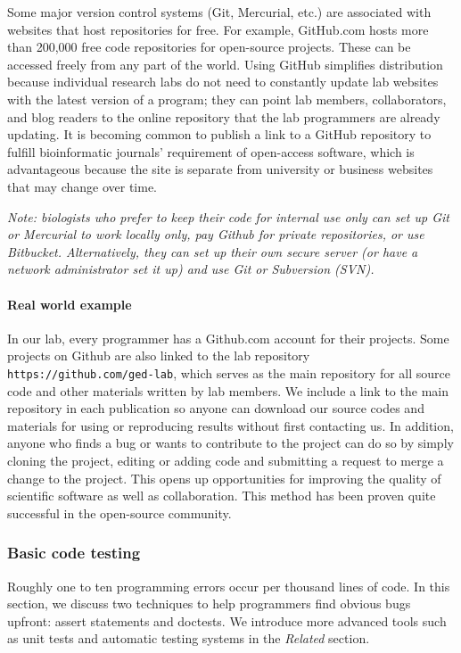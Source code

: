 \documentclass[ChapterTOCs,krantz2]{krantz} %
\begin{document}
Some major version control systems (Git, Mercurial, etc.) are associated with websites 
that host repositories for free.  For example, GitHub.com hosts more than 200,000 free code
repositories for open-source projects. These can be accessed
freely from any part of the world.  Using GitHub
simplifies distribution because individual research labs do not need to
constantly update lab websites with the latest version of a program;
they can point lab members, collaborators, and blog readers to the online
repository that the lab programmers are already updating.  It is becoming 
common to publish a link to a GitHub repository to
fulfill bioinformatic journals' requirement of open-access software, 
which is advantageous because the site is separate from
university or business websites that may change over time.  

\textsl{Note: biologists who prefer to keep their
code for internal use only can set up Git or Mercurial to work 
locally only, pay Github for private repositories, or use Bitbucket.  
Alternatively, they can set up their own secure
server (or have a network administrator set it up) and use
Git or Subversion (SVN).}

\paragraph{Real world example}

In our lab, every programmer has a Github.com account for their projects.
Some
projects on Github are also linked to the lab repository
\texttt{https://github.com/ged-lab}, which serves as the main repository for
all source code and other materials written by lab members. 
We include a link to the main repository in each
publication so anyone can download our source codes and materials
for using or reproducing results without first contacting us. 
In addition, anyone who finds a bug or wants to contribute to
the project can do so by simply cloning the project, editing or adding code
and submitting a request to merge a change to the project.
This opens up opportunities for improving the quality of scientific software
as well as collaboration.
This method has been proven quite successful in the open-source community.

\subsubsection{Basic code testing}

Roughly one to ten programming errors occur 
per thousand lines of code\cite{Boehm2005,Ince2012}.  
In this section, we discuss two techniques to help
programmers find obvious bugs upfront: 
assert statements and doctests. We introduce more advanced
tools such as unit tests and automatic testing systems in the \emph{Related}
section.
\end{document}
